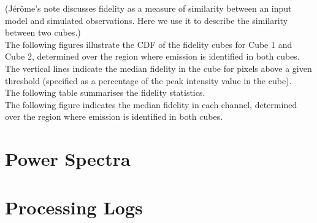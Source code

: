 \documentclass[11pt]{article}
\begin{document}
\noindent (J\'er\^ome's note discusses fidelity as a measure of similarity
between an input model and simulated observations. Here we use it to
describe the similarity between two cubes.)\\

\noindent The following figures illustrate the CDF of the fidelity cubes for
Cube 1 and Cube 2, determined over the region where emission is
identified in both cubes. The vertical lines indicate the median
fidelity in the cube for pixels above a given threshold (specified as
a percentage of the peak intensity value in the cube).\\




\noindent The following table summarises the fidelity statistics.\\



\noindent The following figure indicates the median fidelity in each channel,
determined over the region where emission is identified in both cubes.



\section{Power Spectra}
\label{sec:powerspec}
%


\section{Processing Logs}
\label{sec:logs}

\end{document}
